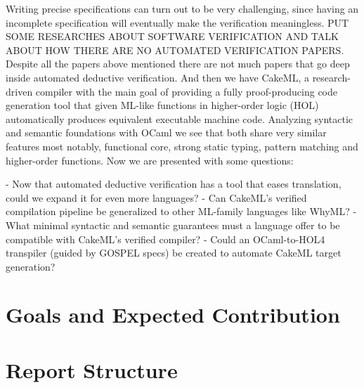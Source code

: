 
Writing precise specifications can turn out to be very challenging, since having an incomplete specification will eventually
make the verification meaningless. PUT SOME RESEARCHES ABOUT SOFTWARE VERIFICATION AND TALK ABOUT HOW THERE ARE NO AUTOMATED VERIFICATION PAPERS.
Despite all the papers above mentioned there are not much papers that go deep inside automated deductive verification.
And then we have CakeML, a research-driven compiler with the main goal of providing a fully proof-producing code generation tool 
that given ML-like functions in higher-order logic (HOL) automatically produces equivalent executable machine code. Analyzing
syntactic and semantic foundations with OCaml we see that both share very similar features most notably, functional core, 
strong static typing, pattern matching and higher-order functions.
Now we are presented with some questions:

- Now that automated deductive verification has a tool that eases translation, could we expand it for even more languages?
- Can CakeML's verified compilation pipeline be generalized to other ML-family languages like WhyML?
- What minimal syntactic and semantic guarantees must a language offer to be compatible with CakeML's verified compiler?
- Could an OCaml-to-HOL4 transpiler (guided by GOSPEL specs) be created to automate CakeML target generation?

\section{Goals and Expected Contribution}
\label{sec:Goals_and_Expected_Contribution}

\section{Report Structure}
\label{sec:Report_Structure}